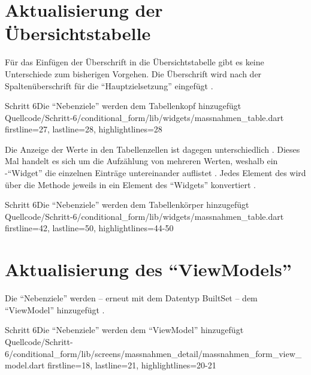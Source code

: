 \section{Aktualisierung der Übersichtstabelle}

Für das Einfügen der Überschrift in die Übersichtstabelle gibt es keine Unterschiede zum bisherigen Vorgehen.
Die Überschrift wird nach der Spaltenüberschrift für die \enquote{Hauptzielsetzung} eingefügt .

\begin{alexlisting}{Schritt 6}{Die \enquote{Nebenziele} werden dem Tabellenkopf hinzugefügt}
  {Quellcode/Schritt-6/conditional_form/lib/widgets/massnahmen_table.dart}
  {firstline=27, lastline=28, highlightlines={28}}
  \label{lst:Schritt6buildColumnHeader}
\end{alexlisting}

Die Anzeige der Werte in den Tabellenzellen ist dagegen unterschiedlich \Lst{\ref{lst:Schritt6buildSelectableCell}}.
Dieses Mal handelt es sich um die Aufzählung von mehreren Werten,
weshalb ein -\enquote{Widget} die einzelnen Einträge untereinander auflistet .
Jedes Element des    wird über die Methode  jeweils in ein Element des \enquote{Widgets}  konvertiert .

\begin{alexlisting}{Schritt 6}{Die \enquote{Nebenziele} werden dem Tabellenkörper hinzugefügt}
  {Quellcode/Schritt-6/conditional_form/lib/widgets/massnahmen_table.dart}
  {firstline=42, lastline=50, highlightlines={44-50}}
  \label{lst:Schritt6buildSelectableCell}
\end{alexlisting}

\section{Aktualisierung des \enquote{ViewModels}}

Die \enquote{Nebenziele} werden -- erneut mit dem Datentyp BuiltSet -- dem \enquote{ViewModel} hinzugefügt \Lst{\ref{lst:Schritt6BehaviorSubjectNebenziele}}.
\begin{alexlisting}{Schritt 6}{Die \enquote{Nebenziele} werden dem \enquote{ViewModel} hinzugefügt}
  {Quellcode/Schritt-6/conditional_form/lib/screens/massnahmen_detail/massnahmen_form_view_model.dart}
  {firstline=18, lastline=21, highlightlines={20-21}}
  \label{lst:Schritt6BehaviorSubjectNebenziele}
\end{alexlisting}

